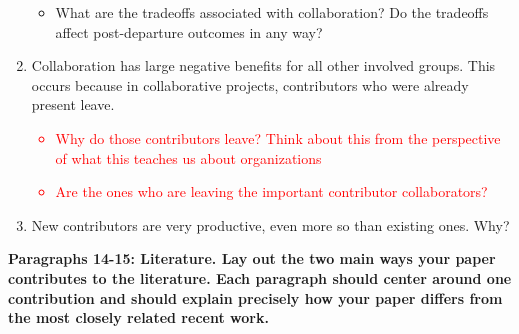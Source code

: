 \documentclass[12pt,notitlepage]{article}
\begin{document}
\begin{enumerate}
{\begin{itemize}
\begin{itemize}
\begin{itemize}
                    \item Do they engage in other forms of responsibility more often, such as reviewing PRs, closing issues, commenting on other's issues? Does this have an effect on outcomes?
                    \item Are they able to do more things independently (either because the departed contributor isn't involved, or becomes less involved) throughout the duration of their collaboration? Does this have an effect on outcomes?
                \end{itemize}
                \item What are the tradeoffs associated with collaboration? Do the tradeoffs affect post-departure outcomes in any way?
            \end{itemize}
        \end{itemize}
    }
    \item Collaboration has large negative benefits for all other involved groups. This occurs because in collaborative projects, contributors who were already present leave. 
    \textcolor{red}{
    \begin{itemize}
            \item Why do those contributors leave? Think about this from the perspective of what this teaches us about organizations
            \item Are the ones who are leaving the important contributor collaborators? 
        \end{itemize}
    }
    \item New contributors are very productive, even more so than existing ones. Why?
\end{enumerate}



\textbf{Paragraphs 14-15: Literature. Lay out the two main ways your paper contributes to the literature. Each paragraph should center around one contribution and should explain precisely how your paper differs from the most closely related recent work.}
\end{document}
